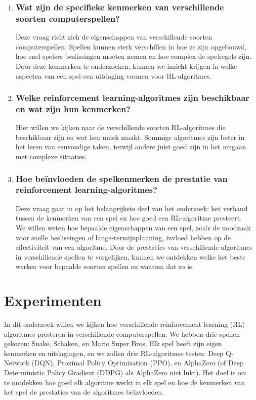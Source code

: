 \documentclass[a4paper,12pt]{article}
\begin{document}
\begin{enumerate}

    \item\subsubsection*{Wat zijn de specifieke kenmerken van verschillende soorten computerspellen?}
          Deze vraag richt zich de eigenschappen van
          verschillende soorten computerspellen. Spellen kunnen sterk verschillen in
          hoe ze zijn opgebouwd, hoe snel spelers beslissingen moeten nemen en hoe
          complex de spelregels zijn. Door deze kenmerken te onderzoeken, kunnen
          we inzicht krijgen in welke aspecten van een spel een uitdaging vormen voor RL-algoritmes.

    \item\subsubsection*{Welke reinforcement learning-algoritmes zijn beschikbaar en wat zijn hun
              kenmerken?}
          Hier willen we kijken naar de verschillende soorten RL-algoritmes die beschikbaar
          zijn en wat hen uniek maakt. Sommige algoritmes zijn beter in het leren van eenvoudige
          taken, terwijl andere juist goed zijn in het omgaan met complexe situaties.

    \item\subsubsection*{Hoe beïnvloeden de spelkenmerken de prestatie van
              reinforcement learning-algoritmes?}

          Deze vraag gaat in op het belangrijkste deel van het onderzoek: het verband
          tussen de kenmerken van een spel en hoe goed een RL-algoritme presteert. We
          willen weten hoe bepaalde eigenschappen van een spel, zoals de noodzaak voor
          snelle beslissingen of lange-termijnplanning, invloed hebben op de
          effectiviteit van een algoritme. Door de prestaties van verschillende
          algoritmes in verschillende spellen te vergelijken, kunnen we ontdekken welke
          het beste werken voor bepaalde soorten spellen en waarom dat zo is.

\end{enumerate}
\section{Experimenten}
In dit onderzoek willen we kijken hoe verschillende reinforcement learning (RL)
algoritmes presteren in verschillende computerspellen. We hebben drie spellen
gekozen: Snake, Schaken, en Mario Super Bros. Elk spel heeft zijn eigen
kenmerken en uitdagingen, en we zullen drie RL-algoritmes testen: Deep
Q-Network (DQN), Proximal Policy Optimization (PPO), en AlphaZero (of Deep
Deterministic Policy Gradient (DDPG) als AlphaZero niet lukt). Het doel is om
te ontdekken hoe goed elk algoritme werkt in elk spel en hoe de kenmerken van
het spel de prestaties van de algoritmes beïnvloeden.
\end{document}
